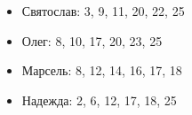 \begin{itemize}
    \item Святослав: 3, 9, 11, 20, 22, 25
    \item Олег: 8, 10, 17, 20, 23, 25
    \item Марсель: 8, 12, 14, 16, 17, 18
    \item Надежда: 2, 6, 12, 17, 18, 25
\end{itemize}